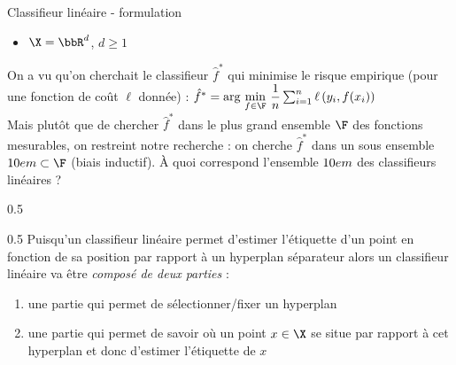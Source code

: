 \documentclass[10pt]{beamer}
\newcommand{\hsp}{\hspace*{1em}}
\begin{document}
\begin{frame}{Classifieur linéaire - formulation}
		\begin{itemize}
		\item $\X = \bbR^d$, $d \geq 1$\\[1em]
	\end{itemize}
	
	On a vu qu'on cherchait le classifieur $\hat{f}^*$ qui minimise le risque empirique (pour une fonction de coût $\ell$ donnée) :
$\hat{f}^*= \text{{arg}}\,\min\limits_{f \in \F}\, \dfrac{1}{n} \sum_{i=1}^n \ell\left(y_i, f(x_i)\right)$\\[1em]
	
	Mais plutôt que de chercher $\hat{f}^*$ dans le plus grand ensemble $\F$ des fonctions mesurables, on restreint notre recherche : on cherche $\hat{f}^*$ dans un sous ensemble $\H \subset \F$ (biais inductif).  À quoi correspond  l'ensemble $10em$ des classifieurs linéaires ?\\[1em]
%	
	\pause
\begin{minipt}[0.1]{0.5}
	\raisebox{1.5mm}{\bclampe \xspace} 
	
\end{minipt}
\begin{minipc}[0.89]{0.5}
Puisqu'un classifieur linéaire permet d'estimer l'étiquette d'un point en fonction de sa position par rapport à un hyperplan séparateur alors un classifieur linéaire va être \textit{composé de deux parties} :\\

\begin{enumerate}
	\item une partie qui permet de sélectionner/fixer un hyperplan\\[0.5em]
	\item une partie qui permet de savoir où un point $x \in \X$ se situe par rapport à cet hyperplan et donc d'estimer l'étiquette de $x$ 
\end{enumerate}
\end{minipc}
	
\end{frame}
\end{document}
